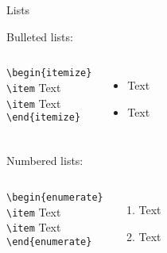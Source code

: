 \begin{frame}{Lists}
\begin{block}{Bulleted lists:}
\vspace{2mm}
\begin{columns}
\hspace{1.5cm}\texttt{\textbackslash begin\{itemize\} \\
\hspace{2cm}\text\textbackslash item} Text \\
\hspace{2cm}\texttt{\textbackslash item} Text \\
\hspace{1.5cm}\texttt{\textbackslash end\{itemize\}}
\begin{itemize}
\item Text
\item Text
\end{itemize}
\end{columns}
\end{block}
\begin{block}{Numbered lists:}
\vspace{2mm}
\begin{columns}
\hspace{1.5cm}\texttt{\textbackslash begin\{enumerate\} \\
\hspace{2cm}\text\textbackslash item} Text \\
\hspace{2cm}\texttt{\textbackslash item} Text \\
\hspace{1.5cm}\texttt{\textbackslash end\{enumerate\}}
\begin{enumerate}
\item Text
\item Text
\end{enumerate}
\end{columns}
\end{block}
\end{frame}



